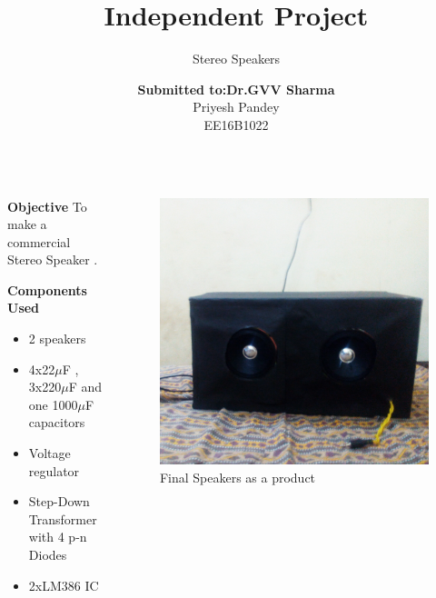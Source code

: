 \documentclass{beamer}
\title{Independent Project}
\subtitle{Stereo Speakers}
\author[Priyesh Pandey]{\textbf{Submitted to:Dr.GVV Sharma}\\  Priyesh Pandey\\EE16B1022} %
\institute{\textbf {IIT Bhilai}}
\date{}
\begin{document}
\begin{frame}
  \titlepage
\end{frame}
\begin{frame}{}
  \begin{columns}
    \begin{column}{0.55\textwidth}
      
\begin{block}{\textbf{Objective}}
To make a commercial Stereo Speaker .
\end{block}
\begin{block}{\textbf{Components Used}}
\small
\begin{itemize}
  \item
    2 speakers
  \item
   4x22$\mu$F , 3x220$\mu$F and one 1000$\mu$F capacitors
  \item
   Voltage regulator
   \item
   Step-Down Transformer with 4 p-n Diodes
   \item
   2xLM386 IC
  \end{itemize}
\end{block}
    \end{column}
    \begin{column}{0.32\textwidth}
    \begin{center}
\begin{figure}[h]
\centering
\caption{\small Final Speakers as a product}
\includegraphics[width=\columnwidth]{12.jpg}
\end{figure}
\end{center}    
    \end{column}
\end{columns}
\end{frame}
\end{document}
